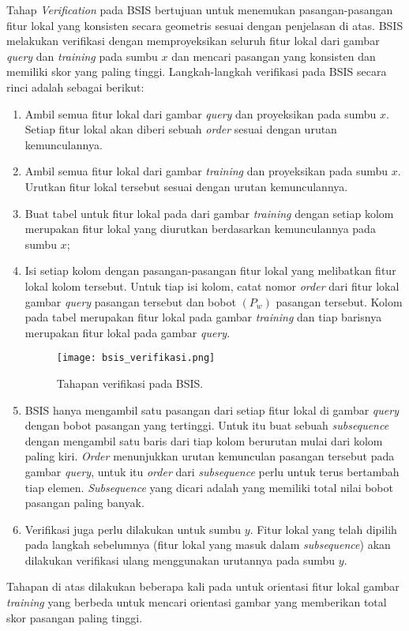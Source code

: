 Tahap \textit{Verification} pada BSIS bertujuan untuk menemukan pasangan-pasangan fitur lokal yang konsisten secara geometris sesuai dengan penjelasan di atas. BSIS melakukan verifikasi dengan memproyeksikan seluruh fitur lokal dari gambar \textit{query} dan \textit{training} pada sumbu $x$ dan mencari pasangan yang konsisten dan memiliki skor yang paling tinggi. Langkah-langkah verifikasi pada BSIS secara rinci adalah sebagai berikut:
\begin{enumerate}
	\item Ambil semua fitur lokal dari gambar \textit{query} dan proyeksikan pada sumbu $x$. Setiap fitur lokal akan diberi sebuah \textit{order} sesuai dengan urutan kemunculannya.
	\item Ambil semua fitur lokal dari gambar \textit{training} dan proyeksikan pada sumbu $x$. Urutkan fitur lokal tersebut sesuai dengan urutan kemunculannya.
	\item Buat tabel untuk fitur lokal pada dari gambar \textit{training} dengan setiap kolom merupakan fitur lokal yang diurutkan berdasarkan kemunculannya pada sumbu $x$;   
	\item Isi setiap kolom dengan pasangan-pasangan fitur lokal yang melibatkan fitur lokal kolom tersebut. Untuk tiap isi kolom, catat nomor \textit{order} dari fitur lokal gambar \textit{query} pasangan tersebut dan bobot $(P_w)$ pasangan tersebut. Kolom pada tabel merupakan fitur lokal pada gambar \textit{training} dan tiap barisnya merupakan fitur lokal pada gambar \textit{query}.
	\begin{figure}[H]
		\centering
		\texttt{[image: bsis\_verifikasi.png]}
		\label{fig:bsis_verifikasi}
		\caption{Tahapan verifikasi pada BSIS.}
	\end{figure}
	\item BSIS hanya mengambil satu pasangan dari setiap fitur lokal di gambar \textit{query} dengan bobot pasangan yang tertinggi. Untuk itu buat sebuah \textit{subsequence} dengan mengambil satu baris dari tiap kolom berurutan mulai dari kolom paling kiri. \textit{Order} menunjukkan urutan kemunculan pasangan tersebut pada gambar \textit{query}, untuk itu \textit{order} dari \textit{subsequence} perlu untuk terus bertambah tiap elemen. \textit{Subsequence} yang dicari adalah yang memiliki total nilai bobot pasangan paling banyak.
	\item Verifikasi juga perlu dilakukan untuk sumbu $y$. Fitur lokal yang telah dipilih pada langkah sebelumnya (fitur lokal yang masuk dalam \textit{subsequence}) akan dilakukan verifikasi ulang menggunakan urutannya pada sumbu $y$.
\end{enumerate}
Tahapan di atas dilakukan beberapa kali pada untuk orientasi fitur lokal gambar \textit{training} yang berbeda untuk mencari orientasi gambar yang memberikan total skor pasangan paling tinggi.

